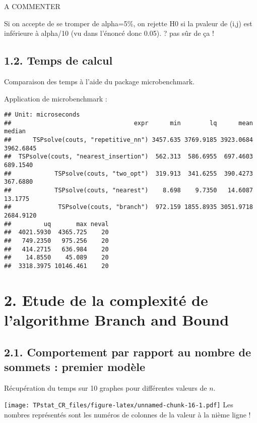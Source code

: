 \documentclass[]{article}
\begin{document}
A COMMENTER

Si on accepte de se tromper de alpha=5\%, on rejette H0 si la pvaleur de
(i,j) est inférieure à alpha/10 (vu dans l'énoncé donc 0.05). ? pas sûr
de ça !

\hypertarget{temps-de-calcul}{%
\subsection{1.2. Temps de calcul}\label{temps-de-calcul}}

Comparaison des temps à l'aide du package microbenchmark.

Application de microbenchmark :

\begin{verbatim}
## Unit: microseconds
##                                  expr      min        lq      mean    median
##      TSPsolve(couts, "repetitive_nn") 3457.635 3769.9185 3923.0684 3962.6845
##  TSPsolve(couts, "nearest_insertion")  562.313  586.6955  697.4603  689.1540
##            TSPsolve(couts, "two_opt")  319.913  341.6255  390.4273  367.6880
##            TSPsolve(couts, "nearest")    8.698    9.7350   14.6087   13.1775
##             TSPsolve(couts, "branch")  972.159 1855.8935 3051.9718 2684.9120
##         uq       max neval
##  4021.5930  4365.725    20
##   749.2350   975.256    20
##   414.2715   636.984    20
##    14.8550    45.089    20
##  3318.3975 10146.461    20
\end{verbatim}

\hypertarget{etude-de-la-complexituxe9-de-lalgorithme-branch-and-bound}{%
\section{2. Etude de la complexité de l'algorithme Branch and
Bound}\label{etude-de-la-complexituxe9-de-lalgorithme-branch-and-bound}}

\hypertarget{comportement-par-rapport-au-nombre-de-sommets-premier-moduxe8le}{%
\subsection{2.1. Comportement par rapport au nombre de sommets : premier
modèle}\label{comportement-par-rapport-au-nombre-de-sommets-premier-moduxe8le}}

Récupération du temps sur 10 graphes pour différentes valeurs de \(n\).

\texttt{[image: TPstat\_CR\_files/figure-latex/unnamed-chunk-16-1.pdf]}
Les nombres représentés sont les numéros de colonnes de la valeur à la
nième ligne !
\end{document}
